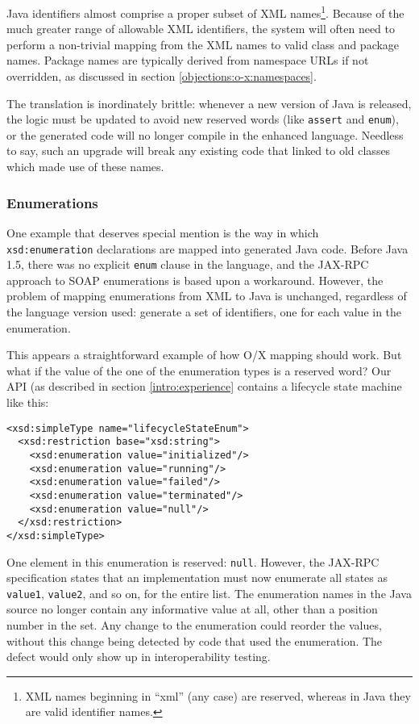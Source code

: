 Java identifiers almost comprise a proper subset of XML
names\footnote{XML names beginning in ``xml'' (any case) are reserved, whereas in
Java they are valid identifier names.}.
Because of the much greater range of allowable XML identifiers, the
system will often need to perform a non-trivial mapping from the XML
names to valid class and package names. Package names are typically
derived from namespace URLs if not overridden, as discussed in section
\ref{objections:o-x:namespaces}.

The translation is inordinately brittle: whenever a new
version of Java is released, the logic must be updated to avoid new
reserved words (like {\tt assert} and {\tt enum}), or the generated
code will no longer compile in the enhanced language. Needless to say,
such an upgrade will break any existing code that linked to old
classes which made use of these names.

\subsubsection{Enumerations}
\label{objections:o-x:enum}

One example that deserves special mention is the way in which {\tt
xsd:enumeration} declarations are mapped into generated Java code. Before Java 1.5,
there was no explicit {\tt enum} clause in the language, and the
JAX-RPC approach to SOAP enumerations is based upon a
workaround. However, the problem of mapping enumerations from XML to
Java is unchanged, regardless of the language version used: generate a
set of identifiers, one for each value in the enumeration.

This appears a straightforward example of how O/X mapping should
work. But what if the value of the one of the enumeration types is a
reserved word?  Our API (as described in section
\ref{intro:experience} contains a lifecycle state machine like this:

\begin{verbatim}
<xsd:simpleType name="lifecycleStateEnum">
  <xsd:restriction base="xsd:string"> 
    <xsd:enumeration value="initialized"/> 
    <xsd:enumeration value="running"/> 
    <xsd:enumeration value="failed"/> 
    <xsd:enumeration value="terminated"/> 
    <xsd:enumeration value="null"/> 
  </xsd:restriction>
</xsd:simpleType>
\end{verbatim}

One element in this enumeration is reserved: {\tt null}. However, the
JAX-RPC specification states that an implementation must now enumerate
all states as {\tt value1}, {\tt value2}, and so on, for the entire
list.  The enumeration names in the Java source no longer contain any
informative value at all, other than a position number in the set. Any
change to the enumeration could reorder the values, without this
change being detected by code that used the enumeration. The defect
would only show up in interoperability testing.

